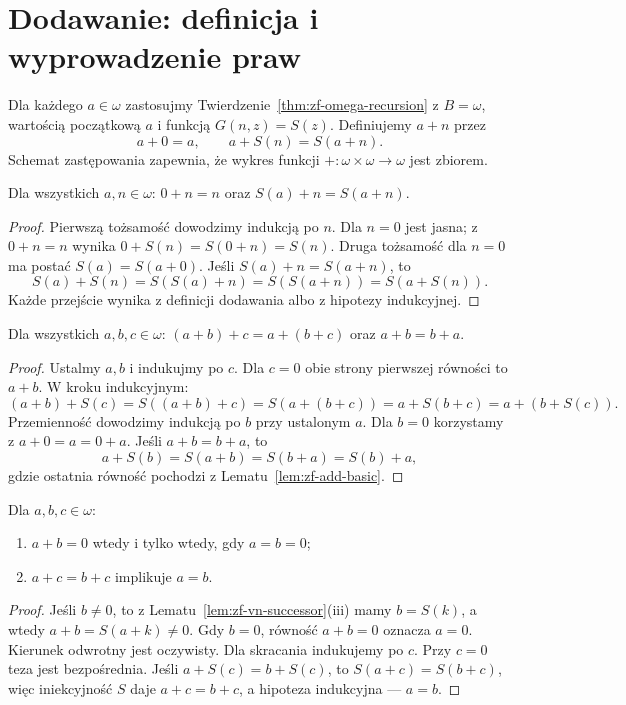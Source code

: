 \section{Dodawanie: definicja i wyprowadzenie praw}

\begin{definicja}\label{def:zf-addition}
Dla każdego $a\in\omega$ zastosujmy
Twierdzenie~\ref{thm:zf-omega-recursion}
z $B=\omega$, wartością początkową $a$
i funkcją $G(n,z)=S(z)$.
Definiujemy $a+n$ przez
\begin{equation}\label{eq:zf-add}
a+0=a,\qquad a+S(n)=S(a+n).
\end{equation}
Schemat zastępowania zapewnia,
że wykres funkcji $+:\omega\times\omega\to\omega$
jest zbiorem.
\end{definicja}

\begin{lemat}
\label{lem:zf-add-basic}
Dla wszystkich $a,n\in\omega$:
$0+n=n$ oraz $S(a)+n=S(a+n)$.
\end{lemat}
\begin{proof}
Pierwszą tożsamość dowodzimy indukcją po $n$.
Dla $n=0$ jest jasna; z $0+n=n$
wynika $0+S(n)=S(0+n)=S(n)$.
Druga tożsamość dla $n=0$ ma postać
$S(a)=S(a+0)$.
Jeśli $S(a)+n=S(a+n)$, to
\[
S(a)+S(n)=S(S(a)+n)=S(S(a+n))=S(a+S(n)).
\]
Każde przejście wynika z definicji dodawania
albo z hipotezy indukcyjnej.
\end{proof}

\begin{twierdzenie}
\label{thm:zf-add-assoc-comm}
Dla wszystkich $a,b,c\in\omega$:
$(a+b)+c=a+(b+c)$ oraz $a+b=b+a$.
\end{twierdzenie}
\begin{proof}
Ustalmy $a,b$ i indukujmy po $c$.
Dla $c=0$ obie strony pierwszej równości
to $a+b$. W kroku indukcyjnym:
\[
(a+b)+S(c)=S((a+b)+c)=S(a+(b+c))
=a+S(b+c)=a+(b+S(c)).
\]
Przemienność dowodzimy indukcją po $b$ przy
ustalonym $a$. Dla $b=0$ korzystamy z
$a+0=a=0+a$. Jeśli $a+b=b+a$, to
\[
a+S(b)=S(a+b)=S(b+a)=S(b)+a,
\]
gdzie ostatnia równość pochodzi
z Lematu~\ref{lem:zf-add-basic}.
\end{proof}

\begin{lemat}
\label{lem:zf-add-cancel}
Dla $a,b,c\in\omega$:
\begin{enumerate}[label=(\roman*)]
\item $a+b=0$ wtedy i tylko wtedy, gdy $a=b=0$;
\item $a+c=b+c$ implikuje $a=b$.
\end{enumerate}
\end{lemat}
\begin{proof}
Jeśli $b\ne0$, to z Lematu~\ref{lem:zf-vn-successor}(iii)
mamy $b=S(k)$, a wtedy
$a+b=S(a+k)\ne0$. Gdy $b=0$,
równość $a+b=0$ oznacza $a=0$.
Kierunek odwrotny jest oczywisty.
Dla skracania indukujemy po $c$.
Przy $c=0$ teza jest bezpośrednia.
Jeśli $a+S(c)=b+S(c)$, to
$S(a+c)=S(b+c)$, więc
iniekcyjność $S$ daje $a+c=b+c$,
a hipoteza indukcyjna --- $a=b$.
\end{proof}

